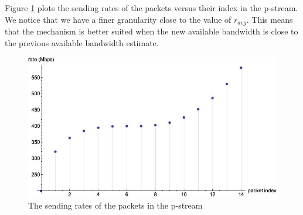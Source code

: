     Figure \ref{rates} plots the sending rates of the packets versus their 
    index in the p-stream. We notice that we have a finer granularity close to 
    the value of $r_{avg}$. This means that the mechanism is better suited 
    when the new available bandwidth is close to the previous available 
    bandwidth estimate.
    \begin{figure}[h]
      \includegraphics[scale=0.45]{img/rates.jpg}
      \caption{The sending rates of the packets in the p-stream}
      \label{rates}
    \end{figure}
